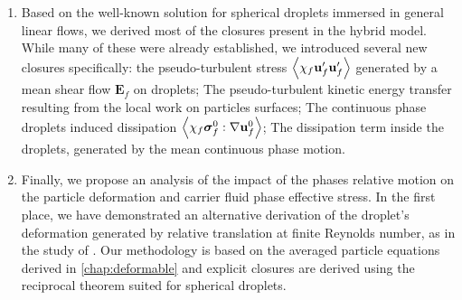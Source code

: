 \begin{enumerate}
    \item Based on the well-known solution for spherical droplets immersed in general linear flows, we derived most of the closures present in the hybrid model. 
    While many of these were already established, we introduced several new closures specifically: 
    the pseudo-turbulent stress $\left<\chi_f \textbf{u}_f'\textbf{u}_f'\right>$ generated by a mean shear flow $\textbf{E}_f$ on droplets; 
    The pseudo-turbulent kinetic energy transfer resulting from the local work on particles surfaces; 
    The continuous phase droplets induced dissipation $\left<\chi_f \bm\sigma_f^0:\mathbf{\nabla} \textbf{u}_f^0\right>$; 
    The dissipation term inside the droplets, generated by the mean continuous phase motion. 
    \item Finally, we propose an analysis of the impact of the phases relative motion on the particle deformation and carrier fluid phase effective stress. 
    In the first place, we have demonstrated an alternative derivation of the droplet's deformation generated by relative translation at finite Reynolds number, as in the study of \citet{taylor1964deformation}. 
    Our methodology is based on the averaged particle equations derived in \ref{chap:deformable} and explicit closures are derived using the reciprocal theorem suited for spherical droplets. 

\end{enumerate}
